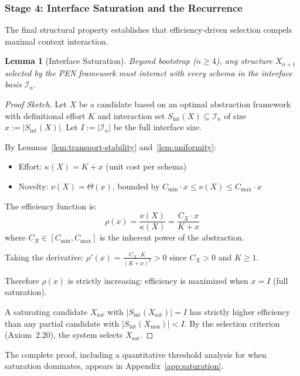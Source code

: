 \documentclass[11pt]{article}
\newtheorem{lemma}[theorem]{Lemma}
\theoremstyle{definition}
\theoremstyle{remark}
\begin{document}
\subsubsection{Stage 4: Interface Saturation and the Recurrence}

The final structural property establishes that efficiency-driven selection compels maximal context
interaction.

\begin{lemma}[Interface Saturation]
\label{lem:saturation}
Beyond bootstrap ($n \geq 4$), any structure $X_{n+1}$ selected by the PEN framework must interact
with every schema in the interface basis $\mathcal{I}_n$.
\end{lemma}

\begin{proof}[Proof Sketch]
Let $X$ be a candidate based on an optimal abstraction framework with definitional effort $K$ and
interaction set $S_{\text{int}}(X) \subseteq \mathcal{I}_n$ of size $x := |S_{\text{int}}(X)|$. Let $I := |\mathcal{I}_n|$ be the full
interface size.

By Lemmas~\ref{lem:transport-stability} and~\ref{lem:uniformity}:
\begin{itemize}
\item Effort: $\kappa(X) = K + x$ (unit cost per schema)
\item Novelty: $\nu(X) = \Theta(x)$, bounded by $C_{\min} \cdot x \leq \nu(X) \leq C_{\max} \cdot x$
\end{itemize}

The efficiency function is:
\[
\rho(x) = \frac{\nu(X)}{\kappa(X)} = \frac{C_X \cdot x}{K + x}
\]
where $C_X \in [C_{\min}, C_{\max}]$ is the inherent power of the abstraction.

Taking the derivative: $\rho'(x) = \frac{C_X \cdot K}{(K+x)^2} > 0$ since $C_X > 0$ and $K \geq 1$.

Therefore $\rho(x)$ is strictly increasing: efficiency is maximized when $x = I$ (full saturation).

A saturating candidate $X_{\text{sat}}$ with $|S_{\text{int}}(X_{\text{sat}})| = I$ has strictly higher efficiency than any
partial candidate with $|S_{\text{int}}(X_{\text{non}})| < I$. By the selection criterion (Axiom~2.20), the system
selects $X_{\text{sat}}$.
\end{proof}

The complete proof, including a quantitative threshold analysis for when saturation dominates,
appears in Appendix~\ref{app:saturation}.
\end{document}
